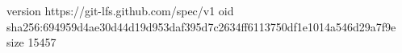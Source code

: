 version https://git-lfs.github.com/spec/v1
oid sha256:694959d4ae30d44d19d953daf395d7c2634ff6113750df1e1014a546d29a7f9e
size 15457
